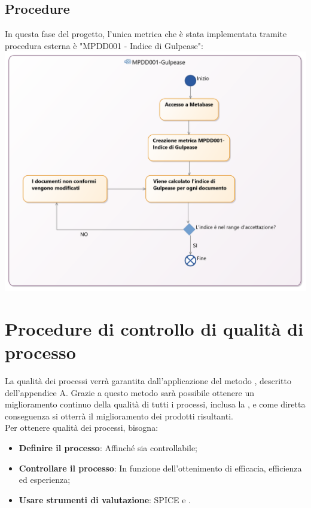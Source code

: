 \documentclass[NormeDiProgetto.tex]{subfiles}
\begin{document}
	\subsection{Procedure}
	In questa fase del progetto, l'unica metrica che è stata implementata tramite procedura esterna è "MPDD001 - Indice di Gulpease":\\
	\includegraphics[scale=0.25]{../../common/images/MetricaGulpease}
	
	\section{Procedure di controllo di qualità di processo}
	La qualità dei processi verrà garantita dall'applicazione del metodo , descritto dell'appendice A. Grazie a questo metodo sarà possibile ottenere un miglioramento continuo della qualità di tutti i processi, inclusa la , e come diretta conseguenza si otterrà il miglioramento dei prodotti risultanti.\\Per ottenere qualità dei processi, bisogna:
	\begin{itemize}
		\item \textbf{Definire il processo}: Affinché sia controllabile;
		\item \textbf{Controllare il processo}: In funzione dell'ottenimento di efficacia, efficienza ed esperienza;
		\item \textbf{Usare strumenti di valutazione}: SPICE e .
	\end{itemize}
	
\end{document}
